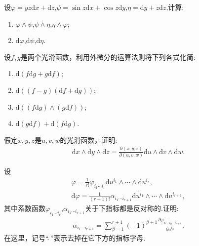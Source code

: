 \documentclass[../../main.tex]{subfiles}%
\begin{document}
\begin{example}
设$\varphi = yz\mathrm{d}x + \mathrm{d}z$,$\psi = \sin z\mathrm{d}x + \cos z\mathrm{d}y$,$\eta = \mathrm{d}y + z\mathrm{d}z$,计算:
\begin{enumerate}[(1)]
\item $\varphi \wedge \psi$,$\psi \wedge \eta$,$\eta \wedge \varphi$;
\item $\mathrm{d}\varphi$,$\mathrm{d}\psi$,$\mathrm{d}\eta$.
\end{enumerate}
\end{example}

\begin{example}
设$f,g$是两个光滑函数，利用外微分的运算法则将下列各式化简:
\begin{enumerate}[(1)]
\item $\mathrm{d}(f\mathrm{d}g + g\mathrm{d}f)$;
\item $\mathrm{d}((f-g)(\mathrm{d}f + \mathrm{d}g))$;
\item $\mathrm{d}((f\mathrm{d}g) \wedge (g\mathrm{d}f))$;
\item $\mathrm{d}(g\mathrm{d}f) + \mathrm{d}(f\mathrm{d}g)$.
\end{enumerate}
\end{example}

\begin{example}
假定$x,y,z$是$u,v,w$的光滑函数，证明:
\begin{align*}
\mathrm{d}x \wedge \mathrm{d}y \wedge \mathrm{d}z = \frac{\partial(x,y,z)}{\partial(u,v,w)}\mathrm{d}u \wedge \mathrm{d}v \wedge \mathrm{d}w.
\end{align*}
\end{example}

\begin{example}
设
\begin{align*}
\varphi = \frac{1}{r!}\varphi_{i_1\cdots i_r}\mathrm{d}u^{i_1} \wedge \cdots \wedge \mathrm{d}u^{i_r}, \\
\mathrm{d}\varphi = \frac{1}{(r+1)!}\alpha_{i_1\cdots i_{r+1}}\mathrm{d}u^{i_1} \wedge \cdots \wedge \mathrm{d}u^{i_{r+1}},
\end{align*}
其中系数函数$\varphi_{i_1\cdots i_r}$,$\alpha_{i_1\cdots i_{r+1}}$关于下指标都是反对称的.证明:
\begin{align*}
\alpha_{i_1\cdots i_{r+1}} = \sum\limits_{\beta=1}^{r+1}(-1)^{\beta+1}\frac{\partial \varphi_{i_1\cdots \hat{i}_\beta\cdots i_{r+1}}}{\partial u^{i_\beta}}.
\end{align*}
在这里，记号“$\hat{\ }$”表示去掉在它下方的指标字母.
\end{example}
\end{document}
